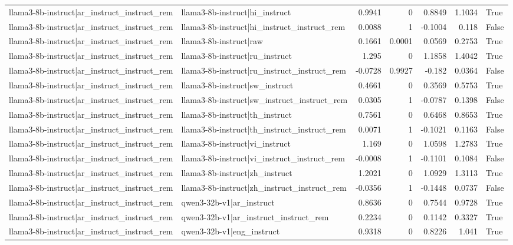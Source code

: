 \begin{table}
\begin{tabular}{l l r r r r l}
llama3-8b-instruct|ar_instruct_instruct_rem & llama3-8b-instruct|hi_instruct & 0.9941 & 0 & 0.8849 & 1.1034 & True \\
llama3-8b-instruct|ar_instruct_instruct_rem & llama3-8b-instruct|hi_instruct_instruct_rem & 0.0088 & 1 & -0.1004 & 0.118 & False \\
llama3-8b-instruct|ar_instruct_instruct_rem & llama3-8b-instruct|raw & 0.1661 & 0.0001 & 0.0569 & 0.2753 & True \\
llama3-8b-instruct|ar_instruct_instruct_rem & llama3-8b-instruct|ru_instruct & 1.295 & 0 & 1.1858 & 1.4042 & True \\
llama3-8b-instruct|ar_instruct_instruct_rem & llama3-8b-instruct|ru_instruct_instruct_rem & -0.0728 & 0.9927 & -0.182 & 0.0364 & False \\
llama3-8b-instruct|ar_instruct_instruct_rem & llama3-8b-instruct|sw_instruct & 0.4661 & 0 & 0.3569 & 0.5753 & True \\
llama3-8b-instruct|ar_instruct_instruct_rem & llama3-8b-instruct|sw_instruct_instruct_rem & 0.0305 & 1 & -0.0787 & 0.1398 & False \\
llama3-8b-instruct|ar_instruct_instruct_rem & llama3-8b-instruct|th_instruct & 0.7561 & 0 & 0.6468 & 0.8653 & True \\
llama3-8b-instruct|ar_instruct_instruct_rem & llama3-8b-instruct|th_instruct_instruct_rem & 0.0071 & 1 & -0.1021 & 0.1163 & False \\
llama3-8b-instruct|ar_instruct_instruct_rem & llama3-8b-instruct|vi_instruct & 1.169 & 0 & 1.0598 & 1.2783 & True \\
llama3-8b-instruct|ar_instruct_instruct_rem & llama3-8b-instruct|vi_instruct_instruct_rem & -0.0008 & 1 & -0.1101 & 0.1084 & False \\
llama3-8b-instruct|ar_instruct_instruct_rem & llama3-8b-instruct|zh_instruct & 1.2021 & 0 & 1.0929 & 1.3113 & True \\
llama3-8b-instruct|ar_instruct_instruct_rem & llama3-8b-instruct|zh_instruct_instruct_rem & -0.0356 & 1 & -0.1448 & 0.0737 & False \\
llama3-8b-instruct|ar_instruct_instruct_rem & qwen3-32b-v1|ar_instruct & 0.8636 & 0 & 0.7544 & 0.9728 & True \\
llama3-8b-instruct|ar_instruct_instruct_rem & qwen3-32b-v1|ar_instruct_instruct_rem & 0.2234 & 0 & 0.1142 & 0.3327 & True \\
llama3-8b-instruct|ar_instruct_instruct_rem & qwen3-32b-v1|eng_instruct & 0.9318 & 0 & 0.8226 & 1.041 & True \\

\end{tabular}
\end{table}
